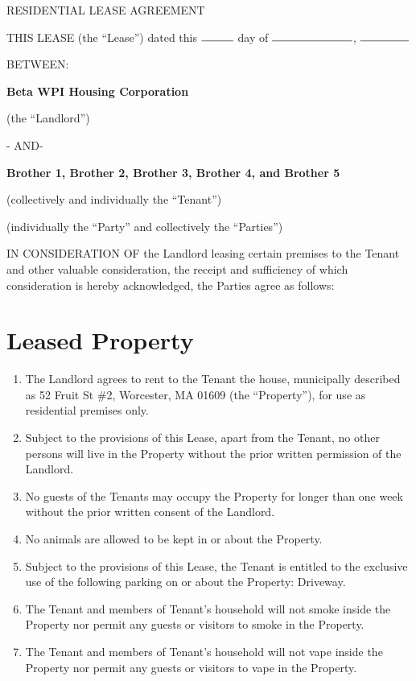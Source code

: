 \documentclass[12pt]{article}
\begin{document}
\begin{center}
RESIDENTIAL LEASE AGREEMENT
\end{center}

THIS LEASE (the ``Lease'') dated this $\rule{1cm}{0.15mm}$ day of
$\rule{2.5cm}{0.15mm}$, $\rule{1.5cm}{0.15mm}$

BETWEEN:

\begin{center}
\textbf{Beta WPI Housing Corporation}

(the ``Landlord'')

- AND-

\textbf{Brother 1, Brother 2, Brother 3, Brother 4, and Brother 5}

(collectively and individually the ``Tenant'')

(individually the ``Party'' and collectively the ``Parties'')
\end{center}

IN CONSIDERATION OF the Landlord leasing certain premises to the Tenant and
other valuable consideration, the receipt and sufficiency of which
consideration is hereby acknowledged, the Parties agree as follows:

\section*{Leased Property}

\begin{enumerate}

    \item The Landlord agrees to rent to the Tenant the house, municipally
	    described as 52 Fruit St \#2, Worcester, MA 01609 (the ``Property''),
		for use as residential premises only.  
    \item Subject to the provisions of this Lease, apart from the Tenant, no
	    other persons will live in the Property without the prior written
		permission of the Landlord.
    \item No guests of the Tenants may occupy the Property for longer than one
	    week without the prior written consent of the Landlord.
    \item No animals are allowed to be kept in or about the Property.
    \item Subject to the provisions of this Lease, the Tenant is entitled to
	    the exclusive use of the following parking on or about the
		Property: Driveway.
    \item The Tenant and members of Tenant's household will not smoke inside
	    the Property nor permit any guests or visitors to smoke in the
		Property.
    \item The Tenant and members of Tenant's household will not vape inside the
	    Property nor permit any guests or visitors to vape in the Property.

\end{enumerate}
    
\end{document}
